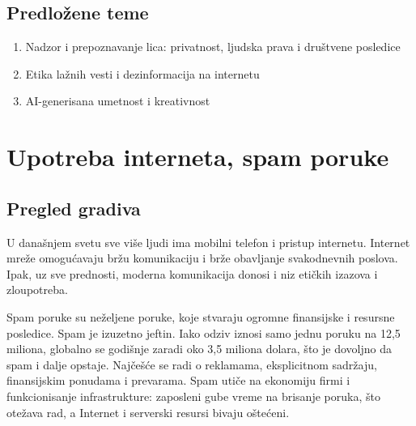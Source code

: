 \documentclass[12pt]{article}
\begin{document}
\subsection{Predložene teme}
\begin{enumerate}
    \item Nadzor i prepoznavanje lica: privatnost, ljudska prava i društvene posledice
    \item Etika lažnih vesti i dezinformacija na internetu
    \item AI-generisana umetnost i kreativnost
\end{enumerate}

\section{Upotreba interneta, spam poruke}
\subsection{Pregled gradiva}
U današnjem svetu sve više ljudi ima mobilni telefon i pristup internetu. Internet mreže omogućavaju bržu komunikaciju i brže obavljanje svakodnevnih poslova. Ipak, uz sve prednosti, moderna komunikacija donosi i niz etičkih izazova i zloupotreba.

Spam poruke su neželjene poruke, koje stvaraju ogromne finansijske i resursne posledice.
Spam je izuzetno jeftin.  Iako odziv iznosi samo jednu poruku na 12,5 miliona, globalno se godišnje zaradi oko 3,5 miliona dolara, što je dovoljno da spam i dalje opstaje. Najčešće se radi o reklamama, eksplicitnom sadržaju, finansijskim ponudama i prevarama. Spam utiče na ekonomiju firmi i funkcionisanje infrastrukture: zaposleni gube vreme na brisanje poruka, što otežava rad, a Internet i serverski resursi bivaju oštećeni.
\end{document}

